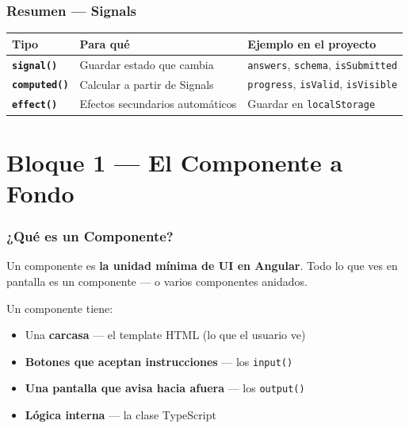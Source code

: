 \documentclass[12pt, a4paper]{article}
\begin{document}
\section{  Resumen — Signals}

\begin{center}
\renewcommand{\arraystretch}{1.6}
\begin{tabular}{>{\bfseries}p{3cm} p{4.5cm} p{5cm}}
\toprule
Tipo & Para qué & Ejemplo en el proyecto \\
\midrule
\texttt{signal()} & Guardar estado que cambia & \texttt{answers}, \texttt{schema}, \texttt{isSubmitted} \\
\texttt{computed()} & Calcular a partir de Signals & \texttt{progress}, \texttt{isValid}, \texttt{isVisible} \\
\texttt{effect()} & Efectos secundarios automáticos & Guardar en \texttt{localStorage} \\
\bottomrule
\end{tabular}
\end{center}

\newpage
\part{ Bloque 1 — El Componente a Fondo}

\section{  ¿Qué es un Componente?}

Un componente es \textbf{la unidad mínima de UI en Angular}. Todo lo que ves
en pantalla es un componente — o varios componentes anidados.

\begin{tcolorbox}[analogia, title={\emoji{control-knobs} \emoji{puzzle-piece} El Control Remoto}]
Un componente tiene:
\begin{itemize}
  \item {} Una \textbf{carcasa} — el template HTML (lo que el usuario ve)
  \item {} \textbf{Botones que aceptan instrucciones} — los \texttt{input()}
  \item {} \textbf{Una pantalla que avisa hacia afuera} — los \texttt{output()}
  \item {} \textbf{Lógica interna} — la clase TypeScript
\end{itemize}
\end{tcolorbox}
\end{document}
